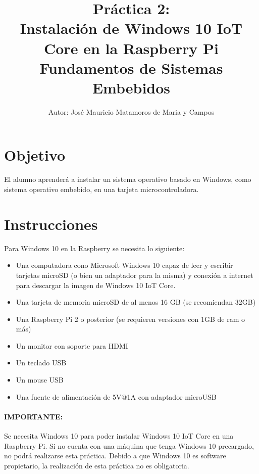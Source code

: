 \documentclass[letterpaper,10.5pt]{article}
\author{\footnotesize Autor: José Mauricio Matamoros de Maria y Campos}
\title{Práctica 2:\\Instalación de Windows 10 IoT Core en la Raspberry Pi\\
{\large Fundamentos de Sistemas Embebidos}}
\date{}
\begin{document}
\maketitle

\section{Objetivo}%
\label{sec:objective}
El alumno aprenderá a instalar un sistema operativo basado en Windows, como sistema operativo embebido, en una tarjeta microcontroladora.


\section{Instrucciones}%
\label{sec:instructions}

Para Windows 10 en la Raspberry se necesita lo siguiente:
\begin{itemize}[nosep]
	\item Una computadora cono Microsoft Windows 10 capaz de leer y escribir tarjetas microSD (o bien un adaptador para la misma) y conexión a internet para descargar la imagen de Windows 10 IoT Core.
	\item Una tarjeta de memoria microSD de al menos 16 GB (se recomiendan 32GB)
	\item Una Raspberry Pi 2 o posterior (se requieren versiones con 1GB de ram o más)
	\item Un monitor con soporte para HDMI
	\item Un teclado USB
	\item Un mouse USB
	\item Una fuente de alimentación de 5V@1A con adaptador microUSB
\end{itemize}

\paragraph*{IMPORTANTE:} Se necesita Windows 10 para poder instalar Windows 10 IoT Core en una Raspberry Pi. Si no cuenta con una máquina que tenga Windows 10 precargado, no podrá realizarse esta práctica. Debido a que Windows 10 es software propietario, la realización de esta práctica no es obligatoria.
\end{document}
